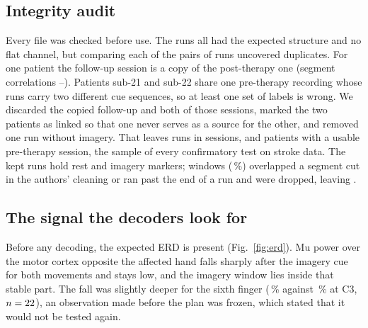 \subsection{Integrity audit}
\label{sec:audit}
Every file was checked before use. The \nRuns{} runs all had the expected structure and no flat
channel, but comparing each of the \auditPairsScreened{} pairs of runs uncovered duplicates. For
one patient the follow-up session is a copy of the post-therapy one (segment correlations
\auditFollowCopyCorrMin--\auditFollowCopyCorrMax). Patients sub-21 and sub-22 share one
pre-therapy recording whose runs carry two different cue sequences, so at least one set of
labels is wrong. We discarded the copied follow-up and both of those sessions, marked the two
patients as linked so that one never serves as a source for the other, and removed one run
without imagery. That leaves \nRunsKept{} runs in \nSessionsKept{} sessions, and \nPre{} patients
with a usable pre-therapy session, the sample of every confirmatory test on stroke data. The kept
runs hold \nEvents{} rest and imagery markers; \nWindowsDropped{} windows
(\nWindowsDroppedPct\,\%) overlapped a segment cut in the authors' cleaning or ran past the end
of a run and were dropped, leaving \nWindows.

\subsection{The signal the decoders look for}
Before any decoding, the expected ERD is present (Fig.~\ref{fig:erd}). Mu power over the motor
cortex opposite the affected hand falls sharply after the imagery cue for both movements and
stays low, and the imagery window lies inside that stable part. The fall was slightly deeper for
the sixth finger (\edaErdMuCThreeSfMean\,\% against \edaErdMuCThreeAhMean\,\% at C3,
$n = 22$), an observation made before the plan was frozen, which stated that it
would not be tested again.

